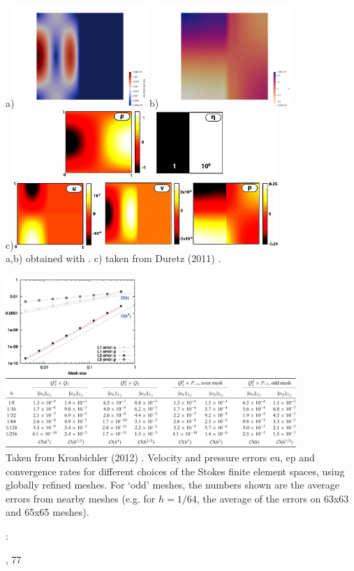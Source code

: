 \begin{center}
a)\includegraphics[width=5cm]{images/benchmark_solcx/vel}
b)\includegraphics[width=5cm]{images/benchmark_solcx/press}\\
c)\includegraphics[width=10cm]{images/benchmark_solcx/dumg11}\\
{\captionfont a,b) obtained with \aspect. c) taken from Duretz \etal (2011) \cite{dumg11}.}
\end{center}

\begin{center}
\includegraphics[width=5cm]{images/benchmark_solcx/krhb12}
\includegraphics[width=11cm]{images/benchmark_solcx/krhb12b}\\
{\captionfont Taken from Kronbichler \etal (2012) \cite{krhb12}.
Velocity and pressure errors eu, ep and convergence rates for different choices of 
the Stokes finite element spaces, using globally refined meshes. 
For ‘odd’ meshes, the numbers shown are the average errors from nearby meshes 
(e.g. for $h=1/64$, the average of the errors on 63x63 and 65x65 meshes).}
\end{center}


\Literature: \cite{mamo08,vemmXX,demh19} 

, 77



